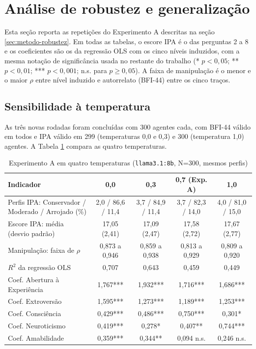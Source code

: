 \section{Análise de robustez e generalização}
\label{sec:resultados-robustez}

Esta seção reporta as repetições do Experimento A descritas na seção
\ref{sec:metodo-robustez}. Em todas as tabelas, o escore IPA é o das
perguntas 2 a 8 e os coeficientes são os da regressão OLS com os cinco
níveis induzidos, com a mesma notação de significância usada no restante
do trabalho (* $p<0{,}05$; ** $p<0{,}01$; *** $p<0{,}001$; n.s. para
$p \geq 0{,}05$). A faixa de manipulação é o menor e o maior $\rho$ entre
nível induzido e autorrelato (BFI-44) entre os cinco traços.

\subsection{Sensibilidade à temperatura}

As três novas rodadas foram concluídas com 300 agentes cada, com BFI-44 válido em
todos e IPA válido em 299 (temperaturas 0,0 e 0,3) e 300 (temperatura
1,0) agentes. A Tabela \ref{tab:robustez-temperatura} compara as quatro
temperaturas.

\begin{table}[htb]
    \caption{Experimento A em quatro temperaturas (\texttt{llama3.1:8b}, N=300, mesmos perfis)}
    \label{tab:robustez-temperatura}
    \centering
    \footnotesize
    \setlength{\tabcolsep}{4pt}
    \begin{tabular}{>{\raggedright\arraybackslash}p{3.4cm}cccc}
        \toprule
        Indicador & 0,0 & 0,3 & 0,7 (Exp. A) & 1,0 \\
        \midrule
        Perfis IPA: Conservador / Moderado / Arrojado (\%) & 2,0 / 86,6 / 11,4 & 3,7 / 84,9 / 11,4 & 3,7 / 82,3 / 14,0 & 4,0 / 81,0 / 15,0 \\
        Escore IPA: média (desvio padrão) & 17,05 (2,41) & 17,09 (2,47) & 17,58 (2,72) & 17,67 (2,77) \\
        Manipulação: faixa de $\rho$ & 0,873 a 0,946 & 0,859 a 0,938 & 0,813 a 0,929 & 0,809 a 0,920 \\
        $R^2$ da regressão OLS & 0,707 & 0,643 & 0,459 & 0,449 \\
        \midrule
        Coef. Abertura à Experiência & 1,767*** & 1,932*** & 1,716*** & 1,686*** \\
        Coef. Extroversão & 1,595*** & 1,273*** & 1,189*** & 1,253*** \\
        Coef. Consciência & 0,429*** & 0,486*** & 0,750*** & 0,301* \\
        Coef. Neuroticismo & 0,419*** & 0,278* & 0,407** & 0,744*** \\
        Coef. Amabilidade & 0,359*** & 0,344** & 0,094 n.s. & 0,246 n.s. \\
        \bottomrule
    \end{tabular}
\end{table}


